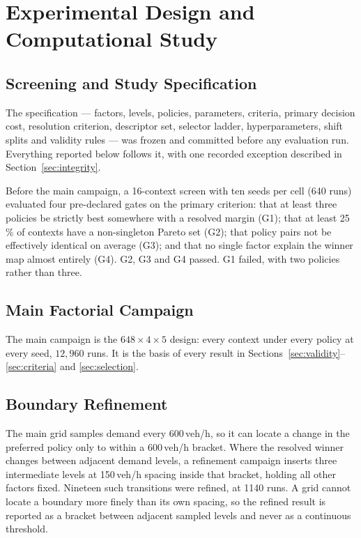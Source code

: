 
\section{Experimental Design and Computational Study}
\label{sec:design}

\subsection{Screening and Study Specification}
\label{sec:design:screen}

The specification --- factors, levels, policies, parameters, criteria, primary
decision cost, resolution criterion, descriptor set, selector ladder,
hyperparameters, shift splits and validity rules --- was frozen and committed
before any evaluation run. Everything reported below follows it, with one
recorded exception described in Section~\ref{sec:integrity}.

Before the main campaign, a 16-context screen with ten seeds per cell (640 runs)
evaluated four pre-declared gates on the primary criterion: that at least three
policies be strictly best somewhere with a resolved margin (G1); that at least
25\,\% of contexts have a non-singleton Pareto set (G2); that policy pairs not be
effectively identical on average (G3); and that no single factor explain the
winner map almost entirely (G4). G2, G3 and G4 passed. G1 failed, with two
policies rather than three.

\subsection{Main Factorial Campaign}
\label{sec:design:main}

The main campaign is the $648 \times 4 \times 5$ design: every context under
every policy at every seed, $12{,}960$ runs. It is the basis of every result in
Sections~\ref{sec:validity}--\ref{sec:criteria} and \ref{sec:selection}.

\subsection{Boundary Refinement}
\label{sec:design:boundary}

The main grid samples demand every 600\,veh/h, so it can locate a change in the
preferred policy only to within a 600\,veh/h bracket. Where the resolved winner
changes between adjacent demand levels, a refinement campaign inserts three
intermediate levels at 150\,veh/h spacing inside that bracket, holding all other
factors fixed. Nineteen such transitions were refined, at 1140 runs. A grid
cannot locate a boundary more finely than its own spacing, so the refined result
is reported as a bracket between adjacent sampled levels and never as a
continuous threshold.

